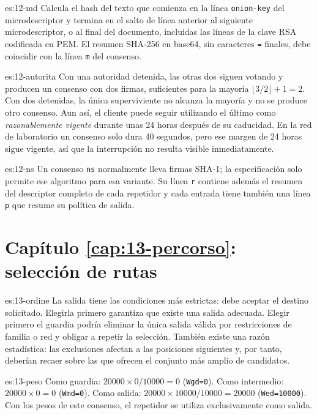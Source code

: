 \begin{soluzione}{es:12-md}
Calcula el hash del texto que comienza en la línea \texttt{onion-key} del microdescriptor y termina en el salto de línea anterior al siguiente microdescriptor, o al final del documento, incluidas las líneas de la clave RSA codificada en PEM. El resumen SHA-256 en base64, sin caracteres \texttt{=} finales, debe coincidir con la línea \texttt{m} del consenso.
\end{soluzione}

\begin{soluzione}{es:12-autorita}
Con una autoridad detenida, las otras dos siguen votando y producen un consenso con dos firmas, suficientes para la mayoría $\lfloor3/2\rfloor+1=2$. Con dos detenidas, la única superviviente no alcanza la mayoría y no se produce otro consenso. Aun así, el cliente puede seguir utilizando el último como \emph{razonablemente vigente} durante unas 24 horas después de su caducidad. En la red de laboratorio un consenso solo dura 40 segundos, pero ese margen de 24 horas sigue vigente, así que la interrupción no resulta visible inmediatamente.
\end{soluzione}

\begin{soluzione}{es:12-ns}
Un consenso \texttt{ns} normalmente lleva firmas SHA-1; la especificación solo permite ese algoritmo para esa variante. Su línea \texttt{r} contiene además el resumen del descriptor completo de cada repetidor y cada entrada tiene también una línea \texttt{p} que resume su política de salida.
\end{soluzione}

\section*{Capítulo \ref{cap:13-percorso}: selección de rutas}

\begin{soluzione}{es:13-ordine}
La salida tiene las condiciones más estrictas: debe aceptar el destino solicitado. Elegirla primero garantiza que existe una salida adecuada. Elegir primero el guardia podría eliminar la única salida válida por restricciones de familia o red y obligar a repetir la selección. También existe una razón estadística: las exclusiones afectan a las posiciones siguientes y, por tanto, deberían recaer sobre las que ofrecen el conjunto más amplio de candidatos.
\end{soluzione}

\begin{soluzione}{es:13-peso}
Como guardia: $20000\times0/10000=0$ (\texttt{Wgd=0}). Como intermedio: $20000\times0=0$ (\texttt{Wmd=0}). Como salida: $20000\times10000/10000=20000$ (\texttt{Wed=10000}). Con los pesos de este consenso, el repetidor se utiliza exclusivamente como salida.
\end{soluzione}

